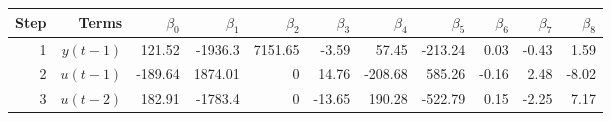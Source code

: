 \begin{tabular}{rrrrrrrrrrr}
Step & Terms & $\beta_{0}$ & $\beta_{1}$ & $\beta_{2}$ & $\beta_{3}$ & $\beta_{4}$ & $\beta_{5}$ & $\beta_{6}$ & $\beta_{7}$ & $\beta_{8}$ \\ 
\hline 
1 & $y(t-1)$ & 121.52 & -1936.3 & 7151.65 & -3.59 & 57.45 & -213.24 & 0.03 & -0.43 & 1.59 \\ 
2 & $u(t-1)$ & -189.64 & 1874.01 & 0 & 14.76 & -208.68 & 585.26 & -0.16 & 2.48 & -8.02 \\ 
3 & $u(t-2)$ & 182.91 & -1783.4 & 0 & -13.65 & 190.28 & -522.79 & 0.15 & -2.25 & 7.17 \\ 
\hline 
\end{tabular}
